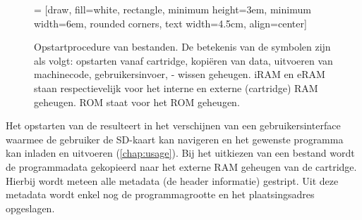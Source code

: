 \begin{figure}[h!]
    \centering

     = [draw, fill=white, rectangle, 
    minimum height=3em, minimum width=6em, rounded corners,
    text width=4.5cm, align=center]

    \tikzset{every picture/.style=thick}
    
    \caption{Opstartprocedure van \cas bestanden. De betekenis van de symbolen zijn als volgt: \faDownload \; opstarten vanaf cartridge, \faCopy \; kopiëren van data, \faCogs \; uitvoeren van machinecode, \faMousePointer \; gebruikersinvoer, \faTrash - wissen geheugen. iRAM en eRAM staan respectievelijk voor het interne en externe (cartridge) RAM geheugen. ROM staat voor het  ROM geheugen.}
    \label{fig:loading-cas-file}
\end{figure}

Het opstarten van de \launcher resulteert in het verschijnen van een gebruikersinterface waarmee de gebruiker de SD-kaart kan navigeren en het gewenste programma kan inladen en uitvoeren (\cref{chap:usage}). Bij het uitkiezen van een \cas bestand wordt de programmadata gekopieerd naar het externe RAM geheugen van de cartridge. Hierbij wordt meteen alle metadata (de header informatie) gestript. Uit deze metadata wordt enkel nog de programmagrootte en het plaatsingsadres opgeslagen.

